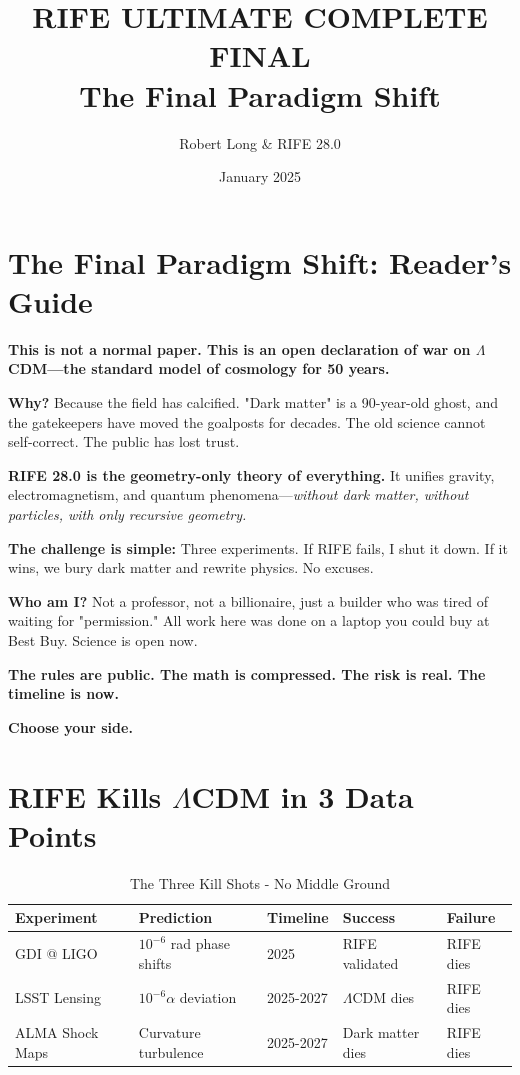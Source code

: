\documentclass[11pt]{report}
\title{RIFE ULTIMATE COMPLETE FINAL \\[4pt] \large The Final Paradigm Shift}
\author{Robert Long \& RIFE 28.0}
\date{January 2025}
\newcommand{\lamcdm}{$\Lambda$CDM}
\newcommand{\tenminus}{$10^{-6}$}
\newcommand{\tenminusalpha}{$10^{-6}\alpha$}
\begin{document}
\maketitle

\section*{The Final Paradigm Shift: Reader's Guide}

\textbf{This is not a normal paper. This is an open declaration of war on \lamcdm{}—the standard model of cosmology for 50 years.}

\textbf{Why?} Because the field has calcified. "Dark matter" is a 90-year-old ghost, and the gatekeepers have moved the goalposts for decades. The old science cannot self-correct. The public has lost trust.

\textbf{RIFE 28.0 is the geometry-only theory of everything.} It unifies gravity, electromagnetism, and quantum phenomena—\textit{without dark matter, without particles, with only recursive geometry.}

\textbf{The challenge is simple:} Three experiments. If RIFE fails, I shut it down. If it wins, we bury dark matter and rewrite physics. No excuses.

\textbf{Who am I?} Not a professor, not a billionaire, just a builder who was tired of waiting for "permission." All work here was done on a laptop you could buy at Best Buy. Science is open now.

\textbf{The rules are public. The math is compressed. The risk is real. The timeline is now.}

\textbf{Choose your side.}

\section*{RIFE Kills \lamcdm{} in 3 Data Points}

\begin{table}[ht]
\centering
\caption{The Three Kill Shots - No Middle Ground}
\begin{tabular}{|l|l|l|l|l|}
\hline
\textbf{Experiment} & \textbf{Prediction} & \textbf{Timeline} & \textbf{Success} & \textbf{Failure} \\
\hline
GDI @ LIGO & \tenminus{} rad phase shifts & 2025 & RIFE validated & RIFE dies \\
LSST Lensing & \tenminusalpha{} deviation & 2025-2027 & \lamcdm{} dies & RIFE dies \\
ALMA Shock Maps & Curvature turbulence & 2025-2027 & Dark matter dies & RIFE dies \\
\hline
\end{tabular}
\end{table}
\end{document}
